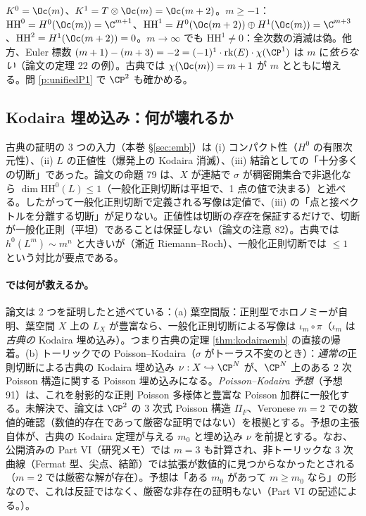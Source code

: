 \begin{ex}[$\sigma=0$、$X=\CP^1$、$E=\Oc(m)$]\label{ex:P1HH}
$K^0=\Oc(m)$、$K^1=T\otimes\Oc(m)=\Oc(m+2)$。$m\ge-1$：$\mathrm{HH}^0=H^0(\Oc(m))=\C^{m+1}$、$\mathrm{HH}^1=H^0(\Oc(m+2))\oplus H^1(\Oc(m))=\C^{m+3}$、$\mathrm{HH}^2=H^1(\Oc(m+2))=0$。$m\to\infty$ でも $\mathrm{HH}^1\neq0$：全次数の消滅は偽。他方、Euler 標数 $(m+1)-(m+3)=-2=(-1)^1\cdot\mathrm{rk}(E)\cdot\chi(\CP^1)$ は $m$ に\emph{依らない}（論文の定理 22 の例）。古典では $\chi(\Oc(m))=m+1$ が $m$ とともに増える。問 \ref{p:unifiedP1} で $\CP^2$ も確かめる。
\end{ex}

\subsection{Kodaira 埋め込み：何が壊れるか}
古典の証明の 3 つの入力（本巻 \S\ref{sec:emb}）は (i) コンパクト性（$H^0$ の有限次元性）、(ii) $L$ の正値性（爆発上の Kodaira 消滅）、(iii) 結論としての「十分多くの切断」であった。論文の命題 79 は、$X$ が連結で $\sigma$ が稠密開集合で非退化なら $\dim\mathrm{HH}^0(L)\le1$（一般化正則切断は平坦で、1 点の値で決まる）と述べる。したがって一般化正則切断で定義される写像は定値で、(iii) の「点と接ベクトルを分離する切断」が足りない。正値性は切断の\emph{存在}を保証するだけで、切断が一般化正則（平坦）であることは保証しない（論文の注意 82）。古典では $h^0(L^m)\sim m^n$ と大きいが（漸近 Riemann--Roch）、一般化正則切断では $\le1$ という対比が要点である。

\paragraph{では何が救えるか。}論文は 2 つを証明したと述べている：(a) 葉空間版：正則型でホロノミーが自明、葉空間 $X$ 上の $L_X$ が豊富なら、一般化正則切断による写像は $\iota_m\circ\pi$（$\iota_m$ は\emph{古典の} Kodaira 埋め込み）。つまり古典の定理 \ref{thm:kodairaemb} の直接の帰着。(b) トーリックでの Poisson--Kodaira（$\sigma$ がトーラス不変のとき）：\emph{通常の}正則切断による古典の Kodaira 埋め込み $\nu:X\hookrightarrow\CP^N$ が、$\CP^N$ 上のある 2 次 Poisson 構造に関する Poisson 埋め込みになる。\emph{Poisson--Kodaira 予想}（予想 91）は、これを射影的な正則 Poisson 多様体と豊富な Poisson 加群に一般化する。未解決で、論文は $\CP^2$ の 3 次式 Poisson 構造 $\Pi_F$、Veronese $m=2$ での数値的確認（数値的存在であって厳密な証明ではない）を根拠とする。予想の主張自体が、古典の Kodaira 定理が与える $m_0$ と埋め込み $\nu$ を前提とする。なお、公開済みの Part VI（研究メモ）では $m=3$ も計算され、非トーリックな 3 次曲線（Fermat 型、尖点、結節）では拡張が数値的に見つからなかったとされる（$m=2$ では厳密な解が存在）。予想は「ある $m_0$ があって $m\ge m_0$ なら」の形なので、これは反証ではなく、厳密な非存在の証明もない（Part VI の記述による。\tQ）。

